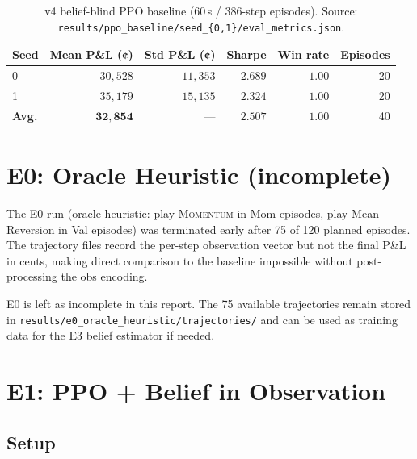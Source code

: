 \documentclass[11pt]{article}
\begin{document}
\begin{table}[H]
\centering
\begin{tabular}{lrrrrr}
\toprule
\textbf{Seed} &
\textbf{Mean P\&L (¢)} &
\textbf{Std P\&L (¢)} &
\textbf{Sharpe} &
\textbf{Win rate} &
\textbf{Episodes} \\
\midrule
0 & $30{,}528$ & $11{,}353$ & $2.689$ & $1.00$ & 20 \\
1 & $35{,}179$ & $15{,}135$ & $2.324$ & $1.00$ & 20 \\
\midrule
\textbf{Avg.} & $\mathbf{32{,}854}$ & --- & $\mathbf{2.507}$ & $\mathbf{1.00}$ & 40 \\
\bottomrule
\end{tabular}
\caption{v4 belief-blind PPO baseline (60\,s / 386-step episodes).
         Source: \texttt{results/ppo\_baseline/seed\_\{0,1\}/eval\_metrics.json}.}
\label{tab:baseline}
\end{table}

\section{E0: Oracle Heuristic (incomplete)}

The E0 run (oracle heuristic: play \textsc{Momentum} in Mom episodes, play
Mean-Reversion in Val episodes) was terminated early after 75 of 120 planned
episodes. The trajectory files record the per-step observation vector but not
the final P\&L in cents, making direct comparison to the baseline impossible
without post-processing the obs encoding.

E0 is left as incomplete in this report. The 75 available trajectories
remain stored in \texttt{results/e0\_oracle\_heuristic/trajectories/} and
can be used as training data for the E3 belief estimator if needed.

\section{E1: PPO + Belief in Observation}

\subsection{Setup}
\end{document}
